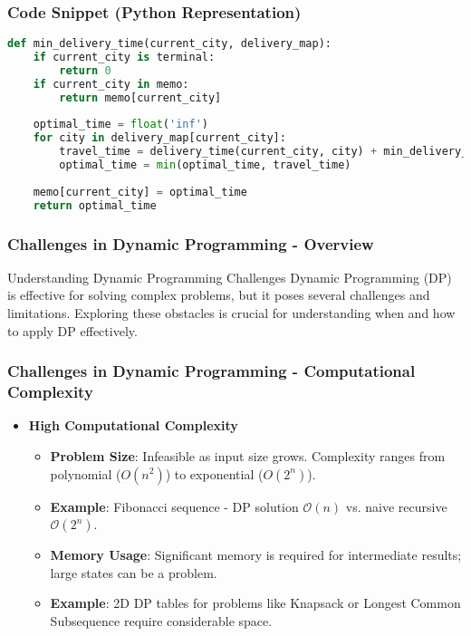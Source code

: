 \documentclass[aspectratio=169]{beamer}
\begin{document}
\begin{frame}[fragile]
    \frametitle{Code Snippet (Python Representation)}
    \begin{lstlisting}[language=Python]
def min_delivery_time(current_city, delivery_map):
    if current_city is terminal:
        return 0
    if current_city in memo:
        return memo[current_city]
    
    optimal_time = float('inf')
    for city in delivery_map[current_city]:
        travel_time = delivery_time(current_city, city) + min_delivery_time(city, delivery_map)
        optimal_time = min(optimal_time, travel_time)
    
    memo[current_city] = optimal_time
    return optimal_time
    \end{lstlisting}
\end{frame}

\begin{frame}[fragile]
    \frametitle{Challenges in Dynamic Programming - Overview}
    \begin{block}{Understanding Dynamic Programming Challenges}
        Dynamic Programming (DP) is effective for solving complex problems, but it poses several challenges and limitations. Exploring these obstacles is crucial for understanding when and how to apply DP effectively.
    \end{block}
\end{frame}

\begin{frame}[fragile]
    \frametitle{Challenges in Dynamic Programming - Computational Complexity}
    \begin{itemize}
        \item \textbf{High Computational Complexity}
        \begin{itemize}
            \item \textbf{Problem Size}: Infeasible as input size grows. Complexity ranges from polynomial ($O(n^2)$) to exponential ($O(2^n)$).
            \item \textbf{Example}: Fibonacci sequence - DP solution $\mathcal{O}(n)$ vs. naive recursive $\mathcal{O}(2^n)$.
  
            \item \textbf{Memory Usage}: Significant memory is required for intermediate results; large states can be a problem.
            \item \textbf{Example}: 2D DP tables for problems like Knapsack or Longest Common Subsequence require considerable space.
        \end{itemize}
    \end{itemize}
\end{frame}
\end{document}
